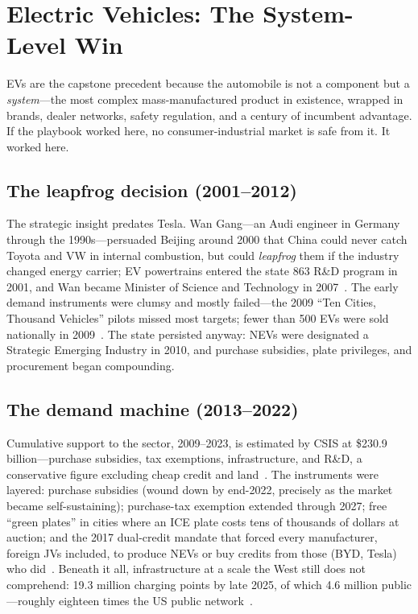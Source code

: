 \chapter{Electric Vehicles: The System-Level Win}
\label{ch:ev}

EVs are the capstone precedent because the automobile is not a component but a \emph{system}---the most complex mass-manufactured product in existence, wrapped in brands, dealer networks, safety regulation, and a century of incumbent advantage. If the playbook worked here, no consumer-industrial market is safe from it. It worked here.

\section{The leapfrog decision (2001--2012)}

The strategic insight predates Tesla. Wan Gang---an Audi engineer in Germany through the 1990s---persuaded Beijing around 2000 that China could never catch Toyota and VW in internal combustion, but could \emph{leapfrog} them if the industry changed energy carrier; EV powertrains entered the state 863 R\&D program in 2001, and Wan became Minister of Science and Technology in 2007~\cite{wan-gang}. The early demand instruments were clumsy and mostly failed---the 2009 ``Ten Cities, Thousand Vehicles'' pilots missed most targets; fewer than 500 EVs were sold nationally in 2009~\cite{ten-cities}. The state persisted anyway: NEVs were designated a Strategic Emerging Industry in 2010, and purchase subsidies, plate privileges, and procurement began compounding.

\section{The demand machine (2013--2022)}

Cumulative support to the sector, 2009--2023, is estimated by CSIS at \$230.9 billion---purchase subsidies, tax exemptions, infrastructure, and R\&D, a conservative figure excluding cheap credit and land~\cite{csis-230b}. The instruments were layered: purchase subsidies (wound down by end-2022, precisely as the market became self-sustaining); purchase-tax exemption extended through 2027; free ``green plates'' in cities where an ICE plate costs tens of thousands of dollars at auction; and the 2017 dual-credit mandate that forced every manufacturer, foreign JVs included, to produce NEVs or buy credits from those (BYD, Tesla) who did~\cite{dual-credit}. Beneath it all, infrastructure at a scale the West still does not comprehend: 19.3 million charging points by late 2025, of which 4.6 million public---roughly eighteen times the US public network~\cite{chargers}.

